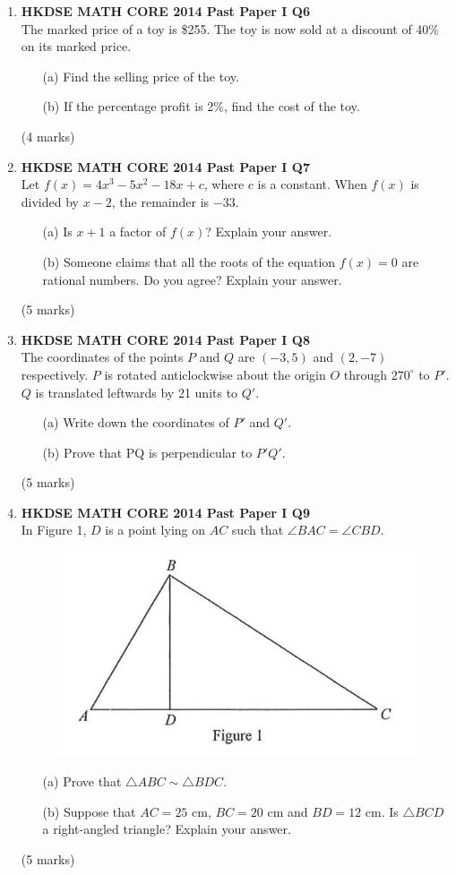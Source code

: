 \documentclass[12pt]{article}
\begin{document}
\begin{enumerate}
	\item \textbf{HKDSE MATH CORE 2014 Past Paper I Q6}\\
	The marked price of a toy is \$255. The toy is now sold at a discount of 40\% on its marked price.
	\begin{enumerate}
		\item[(a)] Find the selling price of the toy.
		\item[(b)] If the percentage profit is 2\%, find the cost of the toy.		
	\end{enumerate}
	(4 marks)

	\item \textbf{HKDSE MATH CORE 2014 Past Paper I Q7}\\
	Let $f(x) = 4x^3 - 5x^2 - 18x + c$, where $c$ is a constant. When  $f(x)$ is divided by $x - 2$, the remainder is $-33$.
	\begin{enumerate}
		\item[(a)] Is $x + 1$ a factor of $f(x)$? Explain your answer.
		\item[(b)] Someone claims that all the roots of the equation  $f(x) = 0$ are rational numbers. Do you agree? Explain your answer.
	\end{enumerate}
	(5 marks)
	
	\item \textbf{HKDSE MATH CORE 2014 Past Paper I Q8}\\
	The coordinates of the points $P$ and $Q$ are $(-3, 5)$ and $(2, -7)$ respectively. $P$ is rotated anticlockwise about the origin $O$ through $270^\circ$ to $P'$. $Q$ is translated leftwards by 21 units to $Q'$.
	\begin{enumerate}
		\item[(a)] Write down the coordinates of $P'$ and $Q'$.
		\item[(b)] Prove that PQ is perpendicular to $P'Q'$.
	\end{enumerate}
	(5 marks)

	\item \textbf{HKDSE MATH CORE 2014 Past Paper I Q9}\\
	In Figure 1, $D$ is a point lying on $AC$ such that $\angle BAC = \angle CBD$.		
	\begin{figure}[H]
		\centering
		\includegraphics[width = .3\linewidth]{2014Figure1.1}
	\end{figure}
	\begin{enumerate}
		\item[(a)] Prove that $\triangle ABC \sim \triangle BDC$.
		\item[(b)] Suppose that $AC = 25$ cm, $BC = 20$ cm and $BD = 12$ cm. Is $\triangle BCD$ a right-angled triangle? Explain your answer.
	\end{enumerate}
	(5 marks)


\end{enumerate}
\end{document}
